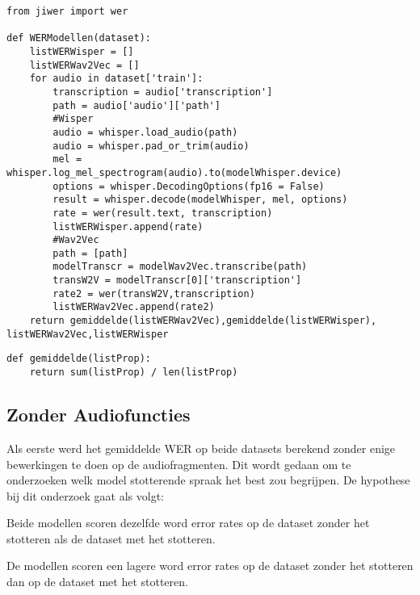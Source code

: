 \begin{listing}[H]
    \begin{verbatim}
from jiwer import wer

def WERModellen(dataset):
    listWERWisper = []
    listWERWav2Vec = []
    for audio in dataset['train']:
        transcription = audio['transcription']
        path = audio['audio']['path']
        #Wisper
        audio = whisper.load_audio(path)
        audio = whisper.pad_or_trim(audio)
        mel = whisper.log_mel_spectrogram(audio).to(modelWhisper.device)
        options = whisper.DecodingOptions(fp16 = False)
        result = whisper.decode(modelWhisper, mel, options)
        rate = wer(result.text, transcription)
        listWERWisper.append(rate)
        #Wav2Vec
        path = [path]
        modelTranscr = modelWav2Vec.transcribe(path)
        transW2V = modelTranscr[0]['transcription']
        rate2 = wer(transW2V,transcription)
        listWERWav2Vec.append(rate2)
    return gemiddelde(listWERWav2Vec),gemiddelde(listWERWisper), listWERWav2Vec,listWERWisper
\end{verbatim}
    \caption{Methode dat de word error rate (WER) van de ASR-modellen (Whisper, Wav2Vec 2.0) berekend op een bepaalde dataset. De dataset moet als argument worden meegegeven aan de methode.}
    \label{lst:WERMethode}
\end{listing}
\begin{listing}[H]
\begin{verbatim}
def gemiddelde(listProp):
    return sum(listProp) / len(listProp)
\end{verbatim}
\caption{Kleinde methode om het gemiddelde te berekenen. Wordt gebruikt in de WERModellen methode om het gemiddelde WER te berekenen.}
\label{lst:GemMethode}
\end{listing}
\subsection{Zonder Audiofuncties}
Als eerste werd het gemiddelde WER op beide datasets berekend zonder enige bewerkingen te doen op de audiofragmenten. Dit wordt gedaan om te onderzoeken welk model stotterende spraak het best zou begrijpen. De hypothese bij dit onderzoek gaat als volgt: 
\begin{hyp}{0}
Beide modellen scoren dezelfde word error rates op de dataset zonder het stotteren als de dataset met het stotteren.
\end{hyp}
\begin{hyp}{1}
De modellen scoren een lagere word error rates op de dataset zonder het stotteren dan op de dataset met het stotteren.
\end{hyp}
